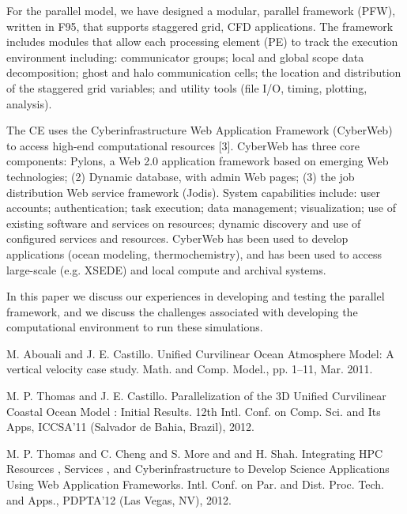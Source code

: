 \documentclass[article,A4,11pt]{llncs}%
\begin{document}
For the parallel model, we have designed a modular, parallel framework (PFW), written in F95, that supports staggered grid, CFD applications. The framework includes modules that allow each processing element (PE) to track the execution environment including: communicator groups; local and global scope data decomposition; ghost and halo communication cells; the location and distribution of the staggered grid variables; and utility tools (file I/O, timing, plotting, analysis). 

The CE uses the Cyberinfrastructure Web Application Framework (CyberWeb) to access high-end computational resources [3]. CyberWeb has three core components: Pylons, a Web 2.0  application framework based on emerging Web technologies; (2) Dynamic database, with admin Web pages; (3) the job distribution Web service framework (Jodis). System capabilities include: user accounts; authentication; task execution; data management; visualization; use of existing software and services on resources; dynamic discovery and use of configured services and resources. CyberWeb has been used to develop applications (ocean modeling, thermochemistry), and has been used to access large-scale (e.g. XSEDE) and local compute and archival systems. 

In this paper we discuss our experiences in developing and testing the parallel framework, and we discuss the challenges associated with developing the computational environment to run these simulations.


\begin{thebibliography}{10}
{\sc M. Abouali and J. E. Castillo}. {Unified Curvilinear Ocean Atmosphere Model: A vertical velocity case study}. Math. and Comp. Model., pp. 1–11, Mar. 2011.

{\sc M. P. Thomas and J. E. Castillo}. {Parallelization of the 3D Unified Curvilinear Coastal Ocean Model : Initial Results}. 12th Intl. Conf. on Comp. Sci. and Its Apps, ICCSA'11 (Salvador de Bahia, Brazil), 2012.

{\sc  M. P. Thomas and C. Cheng and S. More and and H. Shah}. {Integrating HPC Resources , Services , and Cyberinfrastructure to Develop Science Applications Using Web Application Frameworks}. Intl. Conf. on Par. and Dist. Proc. Tech. and Apps., PDPTA'12 (Las Vegas, NV), 2012.
\end{thebibliography}
\end{document}

